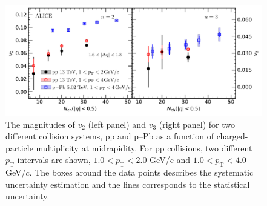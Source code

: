 \begin{figure}[!t]
	\centering
\includegraphics[width=1.0\textwidth]{figures/FIG5_v2Mult_allSystems_Data.pdf} 
	\caption{The magnitudes of $v_2$ (left
    panel) and $v_3$ (right panel) 
 for two different collision systems, pp and p--Pb as a function of charged-particle multiplicity at midrapidity. For pp collisions, two different $p_\mathrm{T}$-intervals are shown, $1.0<p_\mathrm{T}<2.0$ GeV/c and $1.0<p_\mathrm{T}<4.0$ GeV/$c$. The boxes around the data points describes the systematic uncertainty estimation and the lines corresponds to the statistical uncertainty.} 
	\label{fig:v2mult}
\end{figure}


